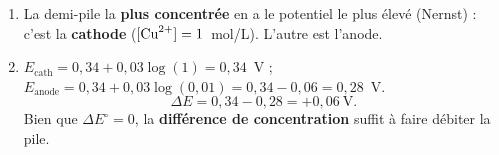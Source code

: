 \documentclass[11pt,a4paper]{article}
\begin{document}
\begin{corrige}
\begin{enumerate}[label=\alph*)]
  \item La demi-pile la \textbf{plus concentrée} en  a le potentiel le plus élevé
        (Nernst) : c'est la \textbf{cathode} ($[\ce{Cu^{2+}}]=1$~mol/L). L'autre est l'anode.
  \item $E_{\text{cath}}=0{,}34+0{,}03\log(1)=0{,}34$~V ;
        $E_{\text{anode}}=0{,}34+0{,}03\log(0{,}01)=0{,}34-0{,}06=0{,}28$~V.
        \[\Delta E=0{,}34-0{,}28=+0{,}06~\text{V}.\]
        Bien que $\Delta E^{\circ}=0$, la \textbf{différence de concentration} suffit à faire débiter
        la pile.
\end{enumerate}
\end{corrige}
\end{document}
